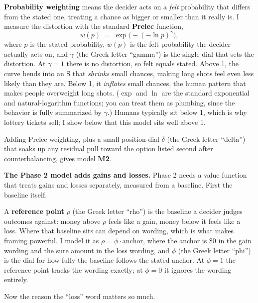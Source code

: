 \documentclass[11pt]{article}
\newcommand{\term}[1]{\textbf{\color{mossdk}#1}}
\begin{document}
\begin{defbox}
\term{Probability weighting} means the decider acts on a \emph{felt} probability that differs from the
stated one, treating a chance as bigger or smaller than it really is. I measure the distortion with the
standard \term{Prelec} function,
\[
w(p) \;=\; \exp\!\big(-(-\ln p)^{\gamma}\big),
\]
where $p$ is the stated probability, $w(p)$ is the felt probability the decider actually acts on, and
$\gamma$ (the Greek letter ``gamma'') is the single dial that sets the distortion. At $\gamma = 1$ there
is no distortion, so felt equals stated. Above 1, the curve bends into an S that \emph{shrinks} small
chances, making long shots feel even less likely than they are. Below 1, it \emph{inflates} small
chances, the human pattern that makes people overweight long shots. ($\exp$ and $\ln$ are the standard
exponential and natural-logarithm functions; you can treat them as plumbing, since the behavior is fully
summarized by $\gamma$.) Humans typically sit below 1, which is why lottery tickets sell; I show below
that this model sits well above 1.
\end{defbox}

Adding Prelec weighting, plus a small position dial $\delta$ (the Greek letter ``delta'') that soaks up
any residual pull toward the option listed second after counterbalancing, gives model \textbf{M2}.

\textbf{The Phase 2 model adds gains and losses.} Phase 2 needs a value function that treats gains and
losses separately, measured from a baseline. First the baseline itself.

\begin{defbox}
A \term{reference point} $\rho$ (the Greek letter ``rho'') is the baseline a decider judges outcomes
against: money above $\rho$ feels like a gain, money below it feels like a loss. Where that baseline sits
can depend on wording, which is what makes framing powerful. I model it as $\rho = \phi \cdot
\text{anchor}$, where the anchor is \$0 in the gain wording and the sure amount in the loss wording, and
$\phi$ (the Greek letter ``phi'') is the dial for how fully the baseline follows the stated anchor. At
$\phi = 1$ the reference point tracks the wording exactly; at $\phi = 0$ it ignores the wording entirely.
\end{defbox}

Now the reason the ``loss'' word matters so much.
\end{document}
